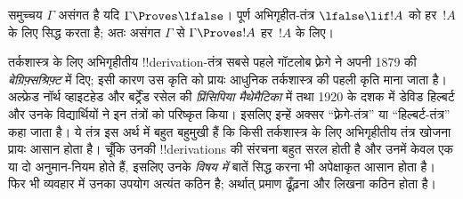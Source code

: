 \documentclass[../../../include/open-logic-section]{subfiles}
\begin{document}
समुच्चय $\Gamma$ असंगत है यदि $\Gamma \Proves \lfalse$। पूर्ण अभिगृहीत-तंत्र
$\lfalse \lif !A$ को हर~$!A$ के लिए सिद्ध करता है; अतः असंगत $\Gamma$ से
$\Gamma \Proves !A$ हर~$!A$ के लिए।

तर्कशास्त्र के लिए अभिगृहीतीय !!{derivation}-तंत्र सबसे पहले गॉटलोब फ़्रेगे
ने अपनी 1879 की \emph{बेग्रिफ़्सश्रिफ़्ट} में दिए; इसी कारण उस कृति को प्रायः
आधुनिक तर्कशास्त्र की पहली कृति माना जाता है। अल्फ्रेड नॉर्थ व्हाइटहेड और
बर्ट्रेंड रसेल की \emph{प्रिंसिपिया मैथेमैटिका} में तथा 1920 के दशक में डेविड
हिल्बर्ट और उनके विद्यार्थियों ने इन तंत्रों को परिष्कृत किया। इसलिए इन्हें
अक्सर ``फ़्रेगे-तंत्र'' या ``हिल्बर्ट-तंत्र'' कहा जाता है। ये तंत्र इस अर्थ
में बहुत बहुमुखी हैं कि किसी तर्कशास्त्र के लिए अभिगृहीतीय तंत्र खोजना प्रायः
आसान होता है। चूँकि उनकी !!{derivation}s की संरचना बहुत सरल होती है और उनमें
केवल एक या दो अनुमान-नियम होते हैं, इसलिए उनके \emph{विषय में} बातें सिद्ध
करना भी अपेक्षाकृत आसान होता है। फिर भी व्यवहार में उनका उपयोग अत्यंत कठिन
है; अर्थात् प्रमाण ढूँढ़ना और लिखना कठिन होता है।
\end{document}
